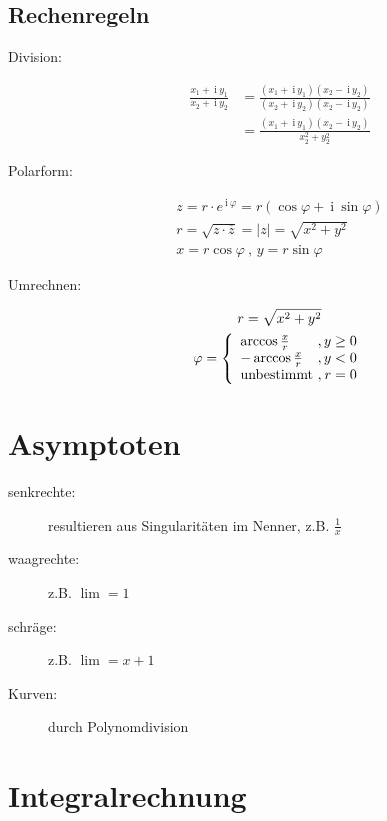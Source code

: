 \documentclass[12pt]{article}
\newcommand{\ci}{\:\mathrm{i}\:}
\begin{document}
\begin{multicols*}{3}
			\subsection{Rechenregeln} %
				\begin{description}
					\item[Division:] \begin{align*}
						\frac{x_1 + \ci y_1}{x_2 + \ci y_2} &= \frac{(x_1 + \ci y_1)(x_2 - \ci y_2)}{(x_2 + \ci y_2)(x_2 - \ci y_2)} \\
						 &= \frac{(x_1 + \ci y_1)(x_2 - \ci y_2)}{x_2^2 + y_2^2}
					\end{align*}
					\item[Polarform:] 
					\begin{gather*}
						z = r \cdot e^{\ci \varphi} = r(\cos \varphi + \ci \sin \varphi) \\
						r = \sqrt{z \cdot \overline{z}} = |z| = \sqrt{x^2 + y^2} \\
						x = r \cos \varphi \ ,\, y = r \sin \varphi
					\end{gather*}
					\item[Umrechnen:] \begin{gather*}
						r = \sqrt{x^2 + y^2} \\
						\varphi = \left\{\begin{array}{l@{\ ,\,}r}
							\arccos \frac{x}{r} & y \geq 0 \\
							-\arccos \frac{x}{r} & y < 0 \\
							\text{unbestimmt} & r = 0
						\end{array}\right.
					\end{gather*}
				\end{description}
		\section{Asymptoten} %
			\begin{description}
				\item[senkrechte:] resultieren aus Singularitäten im Nenner, z.B. $\frac{1}{x}$
				\item[waagrechte:] z.B. $\lim = 1$
				\item[schräge:] z.B. $\lim = x+1$
				\item[Kurven:] durch Polynomdivision
			\end{description}
		\section{Integralrechnung} %

\end{multicols*}
\end{document}
